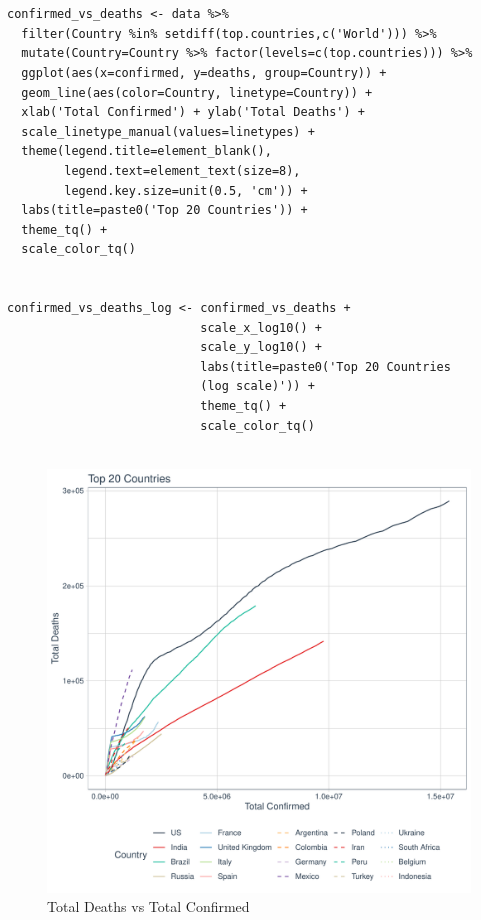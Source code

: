 \begin{verbatim}


confirmed_vs_deaths <- data %>% 
  filter(Country %in% setdiff(top.countries,c('World'))) %>%
  mutate(Country=Country %>% factor(levels=c(top.countries))) %>% 
  ggplot(aes(x=confirmed, y=deaths, group=Country)) +
  geom_line(aes(color=Country, linetype=Country)) +
  xlab('Total Confirmed') + ylab('Total Deaths') +
  scale_linetype_manual(values=linetypes) +
  theme(legend.title=element_blank(),
        legend.text=element_text(size=8),
        legend.key.size=unit(0.5, 'cm')) +
  labs(title=paste0('Top 20 Countries')) +
  theme_tq() +
  scale_color_tq() 


confirmed_vs_deaths_log <- confirmed_vs_deaths + 
                           scale_x_log10() + 
                           scale_y_log10() + 
                           labs(title=paste0('Top 20 Countries 
                           (log scale)')) +
                           theme_tq() +
                           scale_color_tq() 
                    
\end{verbatim}


\begin{figure}[h!]
    \centering
    \includegraphics[width=\linewidth]{images/top_20_countries.pdf}
    \caption{Total Deaths vs Total Confirmed}
    \label{fig:top_20_countries}
\end{figure}
\newpage


